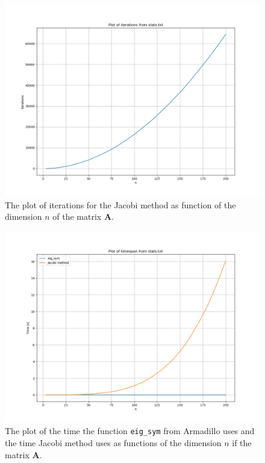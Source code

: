 \documentclass{article}
\begin{document}
\begin{multicols}{2}
  \begin{figure}
    \includegraphics[width=\linewidth]{iterations-stats.png}
    \caption{The plot of iterations for the Jacobi method as function of the dimension $n$ of the matrix \textbf{A}. }
    \label{fig:iterationspng}
  \end{figure}

\newpage

  \begin{figure}
    \includegraphics[width=\linewidth]{timespan-stats.png}
    \caption{The plot of the time the function \texttt{eig\_sym} from Armadillo uses and the time Jacobi method uses as functions of the dimension $n$ if the matrix \textbf{A}.}
    \label{fig:timespanpng}
  \end{figure}



\end{multicols}
\end{document}
